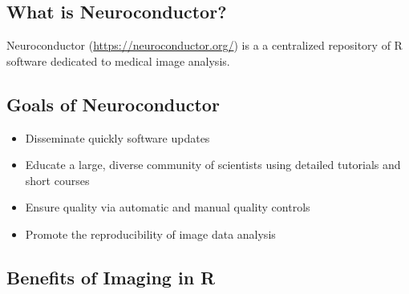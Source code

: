 \documentclass[final]{beamer}\usepackage[]{graphicx}\usepackage[]{color}
\title
{ %
Neuroconductor: An R Platform for Medical Imaging Analysis
}
\author{ %
John Muschelli\inst{1}, Jean-Philippe Fortin\inst{2}, Adrian Gherman\inst{1},Brian Avants\inst{2}, Brandon Whitcher\inst{3,4}, Jonathan D. Clayden\inst{5}, Brian S. Caffo\inst{1}, Ciprian M. Crainiceanu\inst{1}
}
\institute
[Johns Hopkins Bloomberg School of Public Health] %
{
\inst{1} Johns Hopkins Bloomberg School of Public Health, Department of
Biostatistics\\[0.3ex]
\inst{2} Perelman School of Medicine, University of Pennsylvania \;
\inst{3} Klarismo Ltd, London, UK\\[0.3ex]
\inst{4} Department of Mathematics, Imperial College London, London, UK \\[0.3ex]
\inst{5} Institute of Child Health, Developmental Imaging and Biophysics Section, University College London, UK
}
\date{\today}
\begin{document}
\vspace{-4cm}

\begin{frame}[fragile]
\vspace{-2cm}

\begin{table}[!htb]









\begin{minipage}{0.21\linewidth}
\section{What is Neuroconductor?}

Neuroconductor (\url{https://neuroconductor.org/}) is a a centralized repository of R software dedicated to medical image analysis.

\subsection{Goals of Neuroconductor}

\begin{itemize}
\item Disseminate quickly software updates
\item Educate a large, diverse community of scientists using detailed tutorials and short courses
\item Ensure quality via automatic and manual quality controls
\item Promote the reproducibility of image data analysis
\end{itemize}

% 
% 
% 

\subsection{Benefits of Imaging in R}


\end{minipage}
\end{table}
\end{frame}
\end{document}
